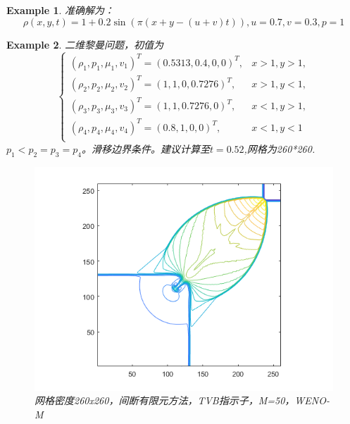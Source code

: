 \documentclass{article}
\newtheorem{example}{Example}
\numberwithin{equation}{subsection}    %
\begin{document}
\begin{appendix}
\begin{example}
        准确解为：
        \begin{equation}
            \rho(x,y,t) = 1+0.2\sin(\pi(x+y-(u+v)t)),u=0.7,v=0.3,p=1
        \end{equation}
    \end{example}
    \begin{example}
        二维黎曼问题\cite{RN13}，初值为
        \begin{equation}
            \begin{cases}
                \left(\rho_{1}, p_{1}, \mu_{1}, v_{1}\right)^{T}=(0.5313,0.4,0,0)^{T}, & x>1, y>1, \\
                \left(\rho_{2}, p_{2}, \mu_{2}, v_{2}\right)^{T}=(1,1,0,0.7276)^{T},   & x>1, y<1, \\
                \left(\rho_{3}, p_{3}, \mu_{3}, v_{3}\right)^{T}=(1,1,0.7276,0)^{T},   & x<1, y>1, \\
                \left(\rho_{4}, p_{4}, \mu_{4}, v_{4}\right)^{T}=(0.8,1,0,0)^{T},      & x<1, y<1  \\
            \end{cases}
        \end{equation}
        $p_1<p_2=p_3=p_4$。滑移边界条件。建议计算至$t=0.52$,网格为260*260.
        \begin{figure}[htp]
            \centering
            \label{fig:}
            \includegraphics[width=0.7\linewidth]{fig/二维黎曼问题}
            \caption{网格密度260x260，间断有限元方法，TVB指示子，M=50，WENO-M}
        \end{figure}
    \end{example}


\end{appendix}
\end{document}
